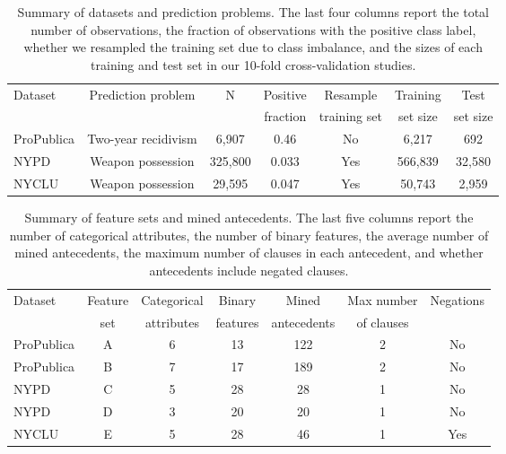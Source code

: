 \begin{table}[t!]
\centering
\begin{tabular}{l|c|c|c|c|c|c}
Dataset & Prediction problem & N & Positive & Resample & Training & Test \\
& & & fraction & training set & set size & set size \\
\hline
ProPublica & Two-year recidivism & 6,907 & 0.46 & No & 6,217 & 692 \\
NYPD & Weapon possession & 325,800 & 0.033 & Yes & 566,839 & 32,580 \\
NYCLU & Weapon possession & 29,595 & 0.047 & Yes & 50,743 & 2,959 \\
\end{tabular}
\caption{Summary of datasets and prediction problems.
%
The last four columns report the total number of observations,
the fraction of observations with the positive class label,
whether we resampled the training set due to class imbalance,
and the sizes of each training and test set in our 10-fold cross-validation studies.
}
\label{tab:datasets}
\end{table}

\begin{table}[t!]
\centering
\begin{tabular}{l|c|c|c|c|c|c}
Dataset & Feature & Categorical & Binary & Mined & Max number & Negations \\
& set & attributes & features & antecedents & of clauses & \\
\hline
ProPublica & A & 6 & 13 & 122 & 2 & No \\
ProPublica & B & 7 & 17 & 189 & 2 & No \\
NYPD & C & 5 & 28 & 28 & 1 & No \\
NYPD & D & 3 & 20 & 20 & 1 & No \\
NYCLU & E & 5 & 28 & 46 & 1 & Yes
\end{tabular}
\caption{Summary of feature sets and mined antecedents.
%
The last five columns report the number of categorical attributes,
the number of binary features, the average number of mined antecedents,
the maximum number of clauses in each antecedent,
and whether antecedents include negated clauses.
}
\label{tab:features}
\end{table}

